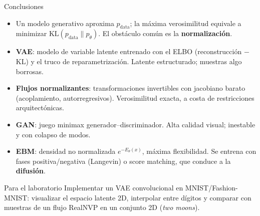 \documentclass[aspectratio=169, 10pt]{beamer}
\newcommand{\KL}{\mathrm{KL}}
\newcommand{\pdata}{p_{\text{data}}}
\begin{document}
\begin{frame}[shrink]{Conclusiones}

	\begin{itemize}
		\item Un modelo generativo aproxima $\pdata$; la m\'axima verosimilitud equivale a minimizar $\KL(\pdata\|p_\theta)$. El obst\'aculo com\'un es la \textbf{normalizaci\'on}.

		\vspace{0.2cm}

		\item \textbf{VAE}: modelo de variable latente entrenado con el ELBO (reconstrucci\'on $-$ KL) y el truco de reparametrizaci\'on. Latente estructurado; muestras algo borrosas.

		\vspace{0.2cm}

		\item \textbf{Flujos normalizantes}: transformaciones invertibles con jacobiano barato (acoplamiento, autorregresivos). Verosimilitud exacta, a costa de restricciones arquitect\'onicas.

		\vspace{0.2cm}

		\item \textbf{GAN}: juego minimax generador--discriminador. Alta calidad visual; inestable y con colapso de modos.

		\vspace{0.2cm}

		\item \textbf{EBM}: densidad no normalizada $e^{-E_\theta(x)}$, m\'axima flexibilidad. Se entrena con fases positiva/negativa (Langevin) o score matching, que conduce a la \textbf{difusi\'on}.
	\end{itemize}

	\vspace{0.3cm}

	\begin{alertblock}{Para el laboratorio}
		Implementar un VAE convolucional en MNIST/Fashion-MNIST: visualizar el espacio latente 2D, interpolar entre d\'igitos y comparar con muestras de un flujo RealNVP en un conjunto 2D (\textit{two moons}).
	\end{alertblock}

\end{frame}
\end{document}
